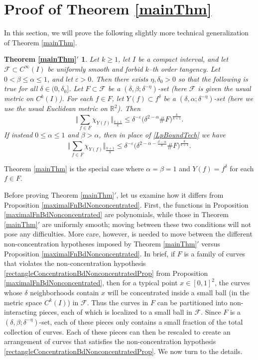 \documentclass[letterpaper, reqno,11pt]{article}
\numberwithin{equation}{section}
\newcommand{\RR}{\mathbb{R}}
\newcommand{\eps}{\varepsilon}
\numberwithin{thm}{section}
\newtheorem*{mainThmTechnical}{Theorem \ref{mainThm}$'$}
\theoremstyle{remark}
\begin{document}
\section{Proof of Theorem \ref{mainThm}}\label{pfOfMainThmSec}
In this section, we will prove the following slightly more technical generalization of Theorem \ref{mainThm}.
\begin{mainThmTechnical}
Let $k\geq 1$, let $I$ be a compact interval, and let $\mathcal{F}\subset C^\infty(I)$ be uniformly smooth and forbid $k$--th order tangency. Let  $0<\beta\leq\alpha\leq 1$, and let $\eps>0$. 
%
Then there exists $\eta,\delta_0>0$ so that the following is true for all $\delta\in (0,\delta_0]$. Let $F\subset\mathcal{F}$ be a $(\delta, \beta; \delta^{-\eta})$-set (here $\mathcal{F}$ is given the usual metric on $C^k(I)$). For each $f\in F$, let $Y(f)\subset f^\delta$ be a $(\delta, \alpha;\delta^{-\eta})$-set (here we use the usual Euclidean metric on $\RR^2$). Then 
\begin{equation}\label{LpBoundTech}
\Big\Vert \sum_{f\in F} \chi_{Y(f)} \Big\Vert_{\frac{k+1}{k}} \leq \delta^{-\eps}\big( \delta^{2-\alpha}\#F\big)^{\frac{k}{k+1}}.
\end{equation}
If instead $0\leq\alpha\leq 1$ and $\beta>\alpha$, then in place of \eqref{LpBoundTech} we have
\begin{equation}
\Big\Vert \sum_{f\in F} \chi_{Y(f)} \Big\Vert_{\frac{k+1}{k}} \leq \delta^{-\eps}\big( \delta^{2-\alpha-\frac{\beta-\alpha}{k}}\#F\big)^{\frac{k}{k+1}}.
\end{equation}
\end{mainThmTechnical}
\noindent Theorem \ref{mainThm} is the special case where $\alpha=\beta=1$ and $Y(f)=f^\delta$ for each $f\in F$. 


Before proving Theorem \ref{mainThm}$'$, let us examine how it differs from Proposition \ref{maximalFnBdNonconcentrated}. First, the functions in Proposition \ref{maximalFnBdNonconcentrated} are polynomials, while those in Theorem \ref{mainThm}$'$ are uniformly smooth; moving between these two conditions will not pose any difficulties. More care, however, is needed to move between the different non-concentration hypotheses imposed by Theorem \ref{mainThm}$'$ versus Proposition \ref{maximalFnBdNonconcentrated}. In brief, if $F$ is a family of curves that violates the non-concentration hypothesis \eqref{rectangleConcentrationBdNonconcentratedProp} from Proposition \ref{maximalFnBdNonconcentrated}, then for a typical point $x\in [0,1]^2$, the curves whose $\delta$ neighborhoods contain $x$ will be concentrated inside a small ball (in the metric space $C^k(I)$) in $\mathcal{F}$. Thus the curves in $F$ can be partitioned into non-interacting pieces, each of which is localized to a small ball in $\mathcal{F}$. Since $F$ is a $(\delta, \beta; \delta^{-\eta})$-set, each of these pieces only contains a small fraction of the total collection of curves.  Each of these pieces can then be rescaled to create an arrangement of curves that satisfies the non-concentration hypothesis \eqref{rectangleConcentrationBdNonconcentratedProp}. We now turn to the details.
\end{document}

